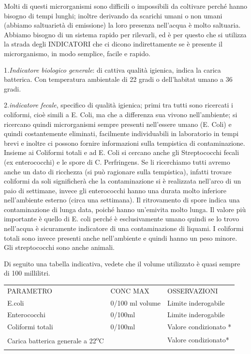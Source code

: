 Molti di questi microrganismi sono difficili o impossibili da coltivare
perché hanno bisogno di tempi lunghi; inoltre derivando da scarichi
umani o non umani (abbiamo saltuarietà di emissione) la loro presenza
nell'acqua è molto saltuaria. Abbiamo bisogno di un sistema rapido per
rilevarli, ed è per questo che si utilizza la strada degli INDICATORI
che ci dicono indirettamente se è presente il microrganismo, in modo
semplice, facile e rapido.

1\emph{.Indicatore biologico generale}: di cattiva qualità igienica,
indica la carica batterica. Con temperatura ambientale di 22 gradi o
dell'habitat umano a 36 gradi.

2.\emph{indicatore fecale}, specifico di qualità igienica; primi tra
tutti sono ricercati i coliformi, cioè simili a E. Coli, ma che a
differenza sua vivono nell'ambiente; si ricercano quindi microrganismi
sempre presenti nell'essere umano (E. Coli) e quindi costantemente
eliminati, facilmente individuabili in laboratorio in tempi brevi e
inoltre ci possono fornire informazioni sulla tempistica di
contaminazione. Insieme ai Coliformi totali e ad E. Coli si cercano
anche gli Streptococchi fecali (ex enterococchi) e le spore di C.
Perfringens. Se li ricerchiamo tutti avremo anche un dato di ricchezza
(si può ragionare sulla tempistica), infatti trovare coliformi da soli
significherà che la contaminazione si è realizzata nell'arco di un paio
di settimane, invece gli enterococchi hanno una durata molto inferiore
nell'ambiente esterno (circa una settimana). Il ritrovamento di spore
indica una contaminazione di lunga data, poiché hanno un'emivita molto
lunga. Il valore più importante è quello di E. coli perché è
esclusivamente umano quindi se lo trovo nell'acqua è sicuramente
indicatore di una contaminazione di liquami. I coliformi totali sono
invece presenti anche nell'ambiente e quindi hanno un peso minore. Gli
streptococchi sono anche animali.

Di seguito una tabella indicativa, vedete che il volume utilizzato è
quasi sempre di 100 millilitri.

\begin{table}
\begin{tabular}{p{}p{}p{}}
\hline\noalign{\smallskip}
PARAMETRO & CONC MAX & OSSERVAZIONI \\
\noalign{\smallskip}\svhline\noalign{\smallskip}

E.coli & 0/100 ml volume & Limite inderogabile \\
Enterococchi & 0/100ml & Limite inderogabile \\
Coliformi totali & 0/100ml & Valore condizionato * \\
Carica batterica generale a 22\textsuperscript{o}C & & Valore condizionato* \\

\noalign{\smallskip}\hline\noalign{\smallskip}
\end{tabular}
\end{table}


